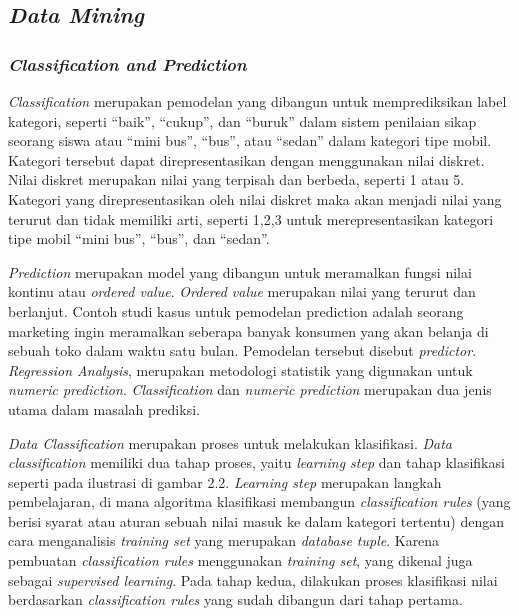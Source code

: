 

\subsection{\textsl{Data Mining}}

\subsubsection{\textsl{Classification and Prediction}}
\textsl{Classification} merupakan pemodelan yang dibangun untuk memprediksikan label kategori, seperti "`baik"', "`cukup"', dan "`buruk"' dalam sistem penilaian sikap seorang siswa atau "`mini bus"', "`bus"', atau "`sedan"' dalam kategori tipe mobil. Kategori tersebut dapat direpresentasikan dengan menggunakan nilai diskret. Nilai diskret merupakan nilai yang terpisah dan berbeda, seperti 1 atau 5. Kategori yang direpresentasikan oleh nilai diskret maka akan menjadi nilai yang terurut dan tidak memiliki arti, seperti 1,2,3 untuk merepresentasikan kategori tipe mobil "`mini bus"', "`bus"', dan "`sedan"'.

\textsl{Prediction} merupakan model yang dibangun untuk meramalkan fungsi nilai kontinu atau \textsl{ordered value}. \textsl{Ordered value} merupakan nilai yang terurut dan berlanjut. Contoh studi kasus untuk pemodelan prediction adalah seorang marketing ingin meramalkan seberapa banyak konsumen yang akan belanja di sebuah toko dalam waktu satu bulan. Pemodelan tersebut disebut \textsl{predictor}. \textsl{Regression Analysis}, merupakan metodologi statistik yang digunakan untuk \textsl{numeric prediction}. \textsl{Classification} dan \textsl{numeric prediction} merupakan dua jenis utama dalam masalah prediksi.

\textsl{Data Classification} merupakan proses untuk melakukan klasifikasi. \textsl{Data classification} memiliki dua tahap proses, yaitu \textsl{learning step} dan tahap klasifikasi seperti pada ilustrasi di gambar 2.2. \textsl{Learning step} merupakan langkah pembelajaran, di mana algoritma klasifikasi membangun \textsl{classification rules} (yang berisi syarat atau aturan sebuah nilai masuk ke dalam kategori tertentu) dengan cara menganalisis \textsl{training set} yang merupakan \textsl{database tuple}. Karena pembuatan \textsl{classification rules} menggunakan \textsl{training set}, yang dikenal juga sebagai \textsl{supervised learning}. 
Pada tahap kedua, dilakukan proses klasifikasi nilai berdasarkan \textsl{classification rules} yang sudah dibangun dari tahap pertama.

